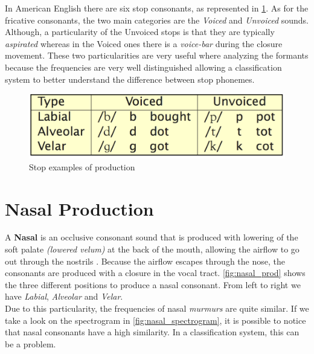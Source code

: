 \noindent In American English there are six stop consonants, as represented in \ref{fig:stop_ex}. As for the fricative consonants, the two main categories are the \textit{Voiced} and \textit{Unvoiced} sounds. Although, a particularity of the Unvoiced stops is that they are typically \textit{aspirated} whereas in the Voiced ones there is a \textit{voice-bar} during the closure movement. These two particularities are very useful where analyzing the formants because the frequencies are very well distinguished allowing a classification system to better understand the difference between stop phonemes.

\begin{figure}[!ht]
    \centering
    \includegraphics[scale=0.5]{Figures/stop_examples.png}
    \caption{Stop examples of production \cite{mit_phonetics}}
    \label{fig:stop_ex}
\end{figure}


\section{Nasal Production}
\label{sec:Nasal Production}
A \textbf{Nasal} is an occlusive consonant sound that is produced with lowering of the soft palate \textit{(lowered velum)} at the back of the mouth, allowing the airflow to go out through the nostrils \cite{nasal_speech_sound}. Because the airflow escapes through the nose, the consonants are produced with a closure in the vocal tract. \ref{fig:nasal_prod} shows the three different positions to produce a nasal consonant. From left to right we have \textit{Labial}, \textit{Alveolar} and \textit{Velar}. \\
\noindent Due to this particularity, the frequencies of nasal \textit{murmurs} are quite similar. If we take a look on the spectrogram in \ref{fig:nasal_spectrogram}, it is possible to notice that nasal consonants have a high similarity. In a classification system, this can be a problem.

